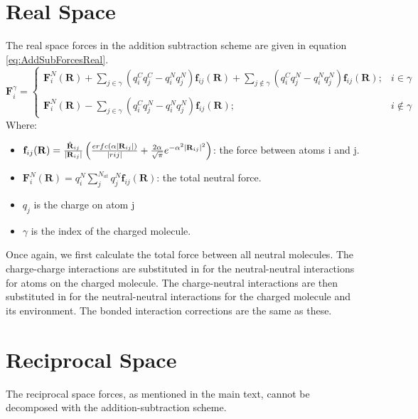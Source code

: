 \section{Real Space}
The real space forces in the addition subtraction scheme are given in equation \eqref{eq:AddSubForcesReal}.
\begin{equation}
  \mathbf{F}_{i}^{\gamma} = \left\lbrace \begin{array}{lc} \mathbf{F}_i^{N}(\mathbf{R}) + \sum_{j \in \gamma} (q_i^{C} q_j^C - q_{i}^N q_j^{N}) \mathbf{f}_{ij}(\mathbf{R}) + \sum_{j \notin \gamma} (q_i^{C} q_j^{N} - q_{i}^N q_j^{N}) \mathbf{f}_{ij}(\mathbf{R}); & i \in \gamma \\\\
\mathbf{F}_i^{N}(\mathbf{R}) - \sum_{j \in \gamma} (q_i^{C} q_j^N - q_{i}^N q_j^{N}) \mathbf{f}_{ij}(\mathbf{R}); & i \notin \gamma
\end{array} \right.
  \label{eq:AddSubForcesReal}
\end{equation}
Where:
\begin{itemize}
  \item $\mathbf{f}_{ij}(\mathbf{R}) = \frac{\hat{\mathbf{R}}_{ij}}{|\mathbf{R}_{ij}|} \left(\frac{erfc\left(\alpha |\mathbf{R}_{ij}| \right)}{|rij|} + \frac{2 \alpha}{\sqrt{\pi}} e^{-\alpha^2 |\mathbf{R}_{ij}|^2} \right)$: the force between atoms i and j.
  \item $\mathbf{F}_i^{N}(\mathbf{R}) = q_i^{N} \sum_{j}^{N_{at}} q_j^N \mathbf{f}_{ij}(\mathbf{R}) $: the total neutral force.
  \item $q_{j}$ is the charge on atom j
  \item $\gamma$ is the index of the charged molecule.
\end{itemize}
Once again, we first calculate the total force between all neutral molecules. The charge-charge interactions are substituted in for the neutral-neutral interactions for atoms on the charged molecule. The charge-neutral interactions are then substituted in for the neutral-neutral interactions for the charged molecule and its environment. The bonded interaction corrections are the same as these.

\section{Reciprocal Space}
\label{ap:EwaldForcesAddSubRecip}
The reciprocal space forces, as mentioned in the main text, cannot be decomposed with the addition-subtraction scheme.

